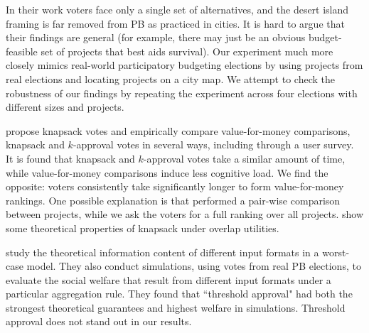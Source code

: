 \documentclass[letterpaper]{article} %
\newcommand{\kibitz}[2]{\ifnum\Comments=1{\color{#1}{#2}}\fi}
\newcommand{\kg}[1]{\kibitz{red}{[Kobi says:#1]}}
\begin{document}
In their work voters face only a single set of alternatives, and the desert island framing is far removed from PB as practiced in cities.  It is  hard  to argue that their findings are general  (for example, there may just be an obvious budget-feasible set of projects that best aids survival).   Our experiment much more closely mimics real-world participatory budgeting elections by using projects from real elections and  locating projects on a city map. We   attempt to check the robustness of our findings by repeating the experiment across four elections with different sizes and projects. %

\citet{goel2019knapsack} propose knapsack votes and empirically compare       value-for-money comparisons, knapsack and $k$-approval votes in several ways, including through a user survey. It is found that knapsack and $k$-approval votes take a similar amount of time, while value-for-money comparisons induce less cognitive load.  We find the opposite: voters consistently take significantly longer to  form value-for-money rankings. One possible explanation is that \citet{goel2019knapsack} performed a pair-wise comparison between projects, while we ask the voters for a full ranking over all projects. \citet{goel2019knapsack}   show some theoretical properties of knapsack under overlap utilities. 

\citet{benade2021preference}  study the theoretical information content of different input formats in a worst-case model.
They also conduct simulations, using votes from real PB elections,  to evaluate the social welfare that result from different input formats under a particular aggregation rule. They found that ``threshold approval" had both the strongest theoretical guarantees and highest welfare in simulations. %
Threshold approval does not stand out in our results.
% 
\end{document}
